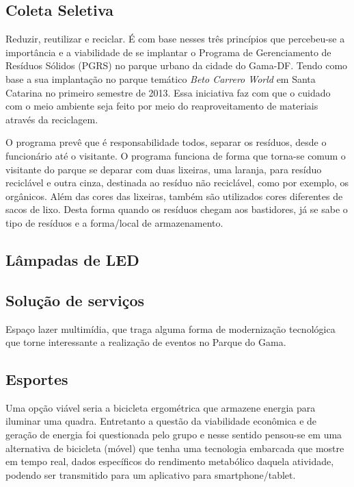 \subsection{Coleta Seletiva}

Reduzir, reutilizar e reciclar. \'E com base nesses tr\^es princ\'ipios que percebeu-se a import\^ancia e a viabilidade de se implantar o Programa de Gerenciamento de Res\'iduos S\'olidos (PGRS) no parque urbano da cidade do Gama-DF. Tendo como base a sua implanta\c{c}\~ao no parque tem\'atico \textit{Beto Carrero World} em Santa Catarina no primeiro semestre de 2013. Essa iniciativa faz com que o cuidado com o meio ambiente seja feito por meio do reaproveitamento de materiais atrav\'es da reciclagem.

	O programa prev\^e que \'e responsabilidade todos, separar os res\'iduos, desde o funcion\'ario at\'e o visitante. O programa funciona de forma que torna-se comum o visitante do parque se deparar com duas lixeiras, uma laranja, para res\'iduo recicl\'avel e outra cinza, destinada ao res\'iduo n\~ao recicl\'avel, como por exemplo, os org\^anicos. Al\'em das cores das lixeiras, tamb\'em s\~ao utilizados cores diferentes de sacos de lixo. Desta forma quando os res\'iduos chegam aos bastidores, j\'a se sabe o tipo de res\'iduos e a forma/local de armazenamento.

\subsection{L\^ampadas de LED}

\subsection{Solu\c{c}\~ao de servi\c{c}os}

Espa\c{c}o lazer multim\'idia, que traga alguma forma de moderniza\c{c}\~ao tecnol\'ogica que torne interessante a realiza\c{c}\~ao de eventos no Parque do Gama.

\subsection{Esportes}

Uma op\c{c}\~ao vi\'avel seria a bicicleta ergom\'etrica que armazene energia para iluminar uma quadra. Entretanto a quest\~ao da viabilidade econ\^omica e de gera\c{c}\~ao de energia foi questionada pelo grupo e nesse sentido pensou-se em uma alternativa de bicicleta (m\'ovel) que tenha uma tecnologia embarcada que mostre em tempo real, dados espec\'ificos do rendimento metab\'olico daquela atividade, podendo ser transmitido para um aplicativo para smartphone/tablet.

